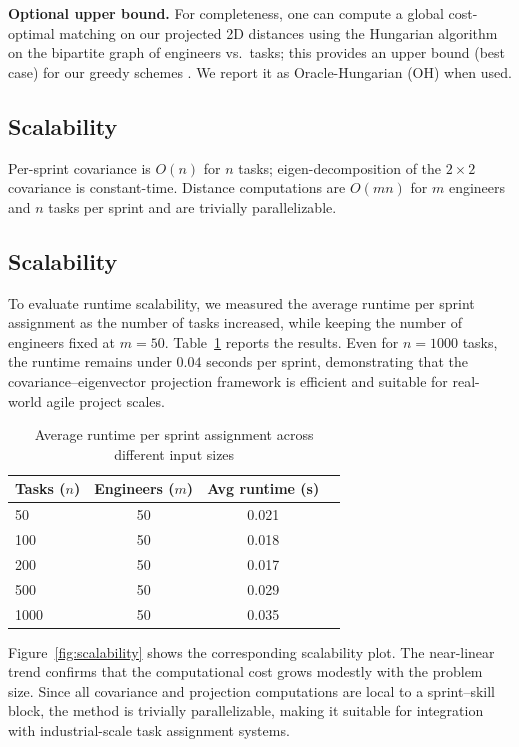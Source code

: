 \documentclass[journal]{IEEEtran}
\begin{document}
\noindent\textbf{Optional upper bound.} For completeness, one can compute a global cost-optimal matching on our projected 2D distances using the Hungarian algorithm on the bipartite graph of engineers vs.\ tasks; this provides an upper bound (best case) for our greedy schemes \cite{kuhn1955hungarian}. We report it as Oracle-Hungarian (OH) when used.

\subsection{Scalability}
Per-sprint covariance is $O(n)$ for $n$ tasks; eigen-decomposition of the $2{\times}2$ covariance is constant-time. Distance computations are $O(mn)$ for $m$ engineers and $n$ tasks per sprint and are trivially parallelizable.

\subsection{Scalability}
\label{sec:scalability}

To evaluate runtime scalability, we measured the average runtime per sprint assignment as the number of tasks increased, while keeping the number of engineers fixed at $m=50$. 
Table~\ref{tab:runtime} reports the results. Even for $n=1000$ tasks, the runtime remains under $0.04$ seconds per sprint, demonstrating that the covariance–eigenvector projection framework is efficient and suitable for real-world agile project scales.

\begin{table}[H]
    \centering
    \caption{Average runtime per sprint assignment across different input sizes}
    \label{tab:runtime}
    \begin{tabular}{lccc}
    \toprule
    Tasks ($n$) & Engineers ($m$) & Avg runtime (s) \\
    \midrule
    50   & 50 & 0.021 \\
    100  & 50 & 0.018 \\
    200  & 50 & 0.017 \\
    500  & 50 & 0.029 \\
    1000 & 50 & 0.035 \\
    \bottomrule
    \end{tabular}
\end{table}

Figure~\ref{fig:scalability} shows the corresponding scalability plot. The near-linear trend confirms that the computational cost grows modestly with the problem size. Since all covariance and projection computations are local to a sprint–skill block, the method is trivially parallelizable, making it suitable for integration with industrial-scale task assignment systems.
\end{document}
